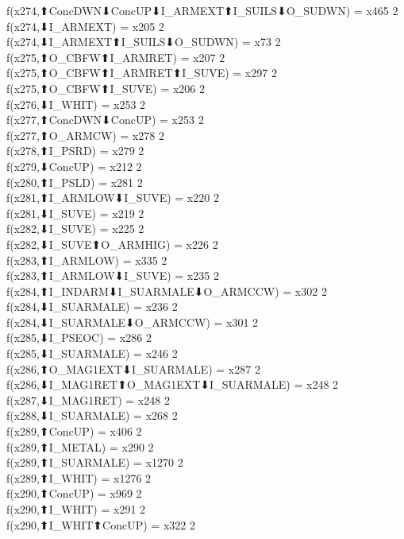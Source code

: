 f(x274,⬆ConcDWN⬇ConcUP⬇I_ARMEXT⬆I_SUILS⬇O_SUDWN) = x465 {2} \\
f(x274,⬇I_ARMEXT) = x205 {2} \\
f(x274,⬇I_ARMEXT⬆I_SUILS⬇O_SUDWN) = x73 {2} \\
f(x275,⬆O_CBFW⬆I_ARMRET) = x207 {2} \\
f(x275,⬆O_CBFW⬆I_ARMRET⬆I_SUVE) = x297 {2} \\
f(x275,⬆O_CBFW⬆I_SUVE) = x206 {2} \\
f(x276,⬇I_WHIT) = x253 {2} \\
f(x277,⬆ConcDWN⬇ConcUP) = x253 {2} \\
f(x277,⬆O_ARMCW) = x278 {2} \\
f(x278,⬆I_PSRD) = x279 {2} \\
f(x279,⬇ConcUP) = x212 {2} \\
f(x280,⬆I_PSLD) = x281 {2} \\
f(x281,⬆I_ARMLOW⬇I_SUVE) = x220 {2} \\
f(x281,⬇I_SUVE) = x219 {2} \\
f(x282,⬇I_SUVE) = x225 {2} \\
f(x282,⬇I_SUVE⬆O_ARMHIG) = x226 {2} \\
f(x283,⬆I_ARMLOW) = x335 {2} \\
f(x283,⬆I_ARMLOW⬇I_SUVE) = x235 {2} \\
f(x284,⬆I_INDARM⬇I_SUARMALE⬇O_ARMCCW) = x302 {2} \\
f(x284,⬇I_SUARMALE) = x236 {2} \\
f(x284,⬇I_SUARMALE⬇O_ARMCCW) = x301 {2} \\
f(x285,⬇I_PSEOC) = x286 {2} \\
f(x285,⬇I_SUARMALE) = x246 {2} \\
f(x286,⬆O_MAG1EXT⬇I_SUARMALE) = x287 {2} \\
f(x286,⬇I_MAG1RET⬆O_MAG1EXT⬇I_SUARMALE) = x248 {2} \\
f(x287,⬇I_MAG1RET) = x248 {2} \\
f(x288,⬇I_SUARMALE) = x268 {2} \\
f(x289,⬆ConcUP) = x406 {2} \\
f(x289,⬆I_METAL) = x290 {2} \\
f(x289,⬆I_SUARMALE) = x1270 {2} \\
f(x289,⬆I_WHIT) = x1276 {2} \\
f(x290,⬆ConcUP) = x969 {2} \\
f(x290,⬆I_WHIT) = x291 {2} \\
f(x290,⬆I_WHIT⬆ConcUP) = x322 {2} \\
